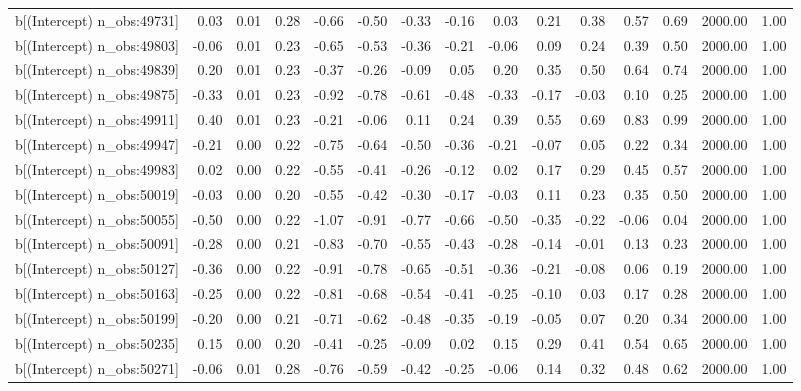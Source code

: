\begin{table}[ht]
\begin{tabular}{rrrrrrrrrrrrrrr}
  b[(Intercept) n\_obs:49731] & 0.03 & 0.01 & 0.28 & -0.66 & -0.50 & -0.33 & -0.16 & 0.03 & 0.21 & 0.38 & 0.57 & 0.69 & 2000.00 & 1.00 \\ 
  b[(Intercept) n\_obs:49803] & -0.06 & 0.01 & 0.23 & -0.65 & -0.53 & -0.36 & -0.21 & -0.06 & 0.09 & 0.24 & 0.39 & 0.50 & 2000.00 & 1.00 \\ 
  b[(Intercept) n\_obs:49839] & 0.20 & 0.01 & 0.23 & -0.37 & -0.26 & -0.09 & 0.05 & 0.20 & 0.35 & 0.50 & 0.64 & 0.74 & 2000.00 & 1.00 \\ 
  b[(Intercept) n\_obs:49875] & -0.33 & 0.01 & 0.23 & -0.92 & -0.78 & -0.61 & -0.48 & -0.33 & -0.17 & -0.03 & 0.10 & 0.25 & 2000.00 & 1.00 \\ 
  b[(Intercept) n\_obs:49911] & 0.40 & 0.01 & 0.23 & -0.21 & -0.06 & 0.11 & 0.24 & 0.39 & 0.55 & 0.69 & 0.83 & 0.99 & 2000.00 & 1.00 \\ 
  b[(Intercept) n\_obs:49947] & -0.21 & 0.00 & 0.22 & -0.75 & -0.64 & -0.50 & -0.36 & -0.21 & -0.07 & 0.05 & 0.22 & 0.34 & 2000.00 & 1.00 \\ 
  b[(Intercept) n\_obs:49983] & 0.02 & 0.00 & 0.22 & -0.55 & -0.41 & -0.26 & -0.12 & 0.02 & 0.17 & 0.29 & 0.45 & 0.57 & 2000.00 & 1.00 \\ 
  b[(Intercept) n\_obs:50019] & -0.03 & 0.00 & 0.20 & -0.55 & -0.42 & -0.30 & -0.17 & -0.03 & 0.11 & 0.23 & 0.35 & 0.50 & 2000.00 & 1.00 \\ 
  b[(Intercept) n\_obs:50055] & -0.50 & 0.00 & 0.22 & -1.07 & -0.91 & -0.77 & -0.66 & -0.50 & -0.35 & -0.22 & -0.06 & 0.04 & 2000.00 & 1.00 \\ 
  b[(Intercept) n\_obs:50091] & -0.28 & 0.00 & 0.21 & -0.83 & -0.70 & -0.55 & -0.43 & -0.28 & -0.14 & -0.01 & 0.13 & 0.23 & 2000.00 & 1.00 \\ 
  b[(Intercept) n\_obs:50127] & -0.36 & 0.00 & 0.22 & -0.91 & -0.78 & -0.65 & -0.51 & -0.36 & -0.21 & -0.08 & 0.06 & 0.19 & 2000.00 & 1.00 \\ 
  b[(Intercept) n\_obs:50163] & -0.25 & 0.00 & 0.22 & -0.81 & -0.68 & -0.54 & -0.41 & -0.25 & -0.10 & 0.03 & 0.17 & 0.28 & 2000.00 & 1.00 \\ 
  b[(Intercept) n\_obs:50199] & -0.20 & 0.00 & 0.21 & -0.71 & -0.62 & -0.48 & -0.35 & -0.19 & -0.05 & 0.07 & 0.20 & 0.34 & 2000.00 & 1.00 \\ 
  b[(Intercept) n\_obs:50235] & 0.15 & 0.00 & 0.20 & -0.41 & -0.25 & -0.09 & 0.02 & 0.15 & 0.29 & 0.41 & 0.54 & 0.65 & 2000.00 & 1.00 \\ 
  b[(Intercept) n\_obs:50271] & -0.06 & 0.01 & 0.28 & -0.76 & -0.59 & -0.42 & -0.25 & -0.06 & 0.14 & 0.32 & 0.48 & 0.62 & 2000.00 & 1.00 \\ 

\end{tabular}
\end{table}
